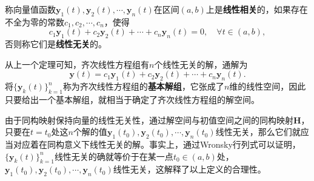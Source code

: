 \begin{definition}[向量值函数的线性相关性]
    称向量值函数$\mathbf{y}_1(t),\mathbf{y}_2(t),\cdots,\mathbf{y}_n(t)$在区间$(a,b)$上是\textbf{线性相关}的，如果存在不全为零的常数$c_1,c_2,\cdots,c_n$，使得
    \begin{equation}
        c_1\mathbf{y}_1(t)+c_2\mathbf{y}_2(t)+\cdots+c_n\mathbf{y}_n(t)=0,\quad \forall t\in(a,b),
    \end{equation}
    否则称它们是\textbf{线性无关}的。
\end{definition}

从上一个定理可知，齐次线性方程组有$n$个线性无关的解，通解为
\begin{equation}
    \mathbf{y}(t)=c_1\mathbf{y}_1(t)+c_2\mathbf{y}_2(t)+\cdots+c_n\mathbf{y}_n(t).
\end{equation}
将$\{\mathbf{y}_k(t)\}_{k=1}^n$称为齐次线性方程组的\textbf{基本解组}，它张成了$n$维的线性空间，因此只要给出一个基本解组，就相当于确定了齐次线性方程组的解空间。

由于同构映射保持向量的线性无关性，通过解空间与初值空间之间的同构映射$\mathbf{H}$，只要在$t=t_0$处这$n$个解的值$\mathbf{y}_1(t_0),\mathbf{y}_2(t_0),\cdots,\mathbf{y}_n(t_0)$线性无关，那么它们就应当对应着在同构意义下线性无关的解。事实上，通过Wronsky行列式可以证明，$\{\mathbf{y}_k(t)\}_{k=1}^n$线性无关的确就等价于在某一点$t_0\in(a,b)$处，$\mathbf{y}_1(t_0),\mathbf{y}_2(t_0),\cdots,\mathbf{y}_n(t_0)$线性无关，这解释了以上定义的合理性。

